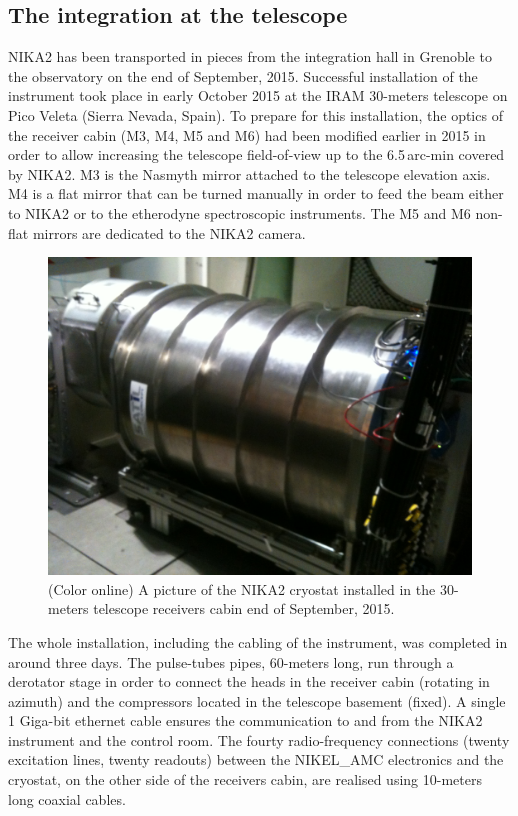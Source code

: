 \documentclass[]{aa} %
\begin{document}
\subsection{The integration at the telescope}
\label{The integration at the telescope}

NIKA2 has been transported in pieces from the integration hall in Grenoble to the observatory on the end of September, 2015. Successful installation of the instrument took place in early October 2015 at the IRAM 30-meters telescope on Pico Veleta (Sierra Nevada, Spain). To prepare for this installation, the optics of the receiver cabin (M3, M4, M5 and M6) had been modified earlier in 2015 in order to allow increasing the telescope field-of-view up to the 6.5\,arc-min covered by NIKA2. M3 is the Nasmyth mirror attached to the telescope elevation axis. M4 is a flat mirror that can be turned manually in order to feed the beam either to NIKA2 or to the etherodyne spectroscopic instruments. The M5 and M6 non-flat mirrors are dedicated to the NIKA2 camera. 

\begin{figure}[h]
   \centering
    \includegraphics[width=.85\linewidth]{NIKA2cryo.jpg}
      \caption{(Color online) A picture of the NIKA2 cryostat installed in the 30-meters telescope receivers cabin end of September, 2015.}
         \label{Fig5}
\end{figure}

The whole installation, including the cabling of the instrument, was completed in around three days. The pulse-tubes pipes, 60-meters long, run through a derotator stage in order to connect the heads in the receiver cabin (rotating in azimuth) and the compressors located in the telescope basement (fixed). A single 1 Giga-bit ethernet cable ensures the communication to and from the NIKA2 instrument and the control room. The fourty radio-frequency connections (twenty excitation lines, twenty readouts) between the NIKEL\_AMC electronics and the cryostat, on the other side of the receivers cabin, are realised using 10-meters long coaxial cables. 
\end{document}
